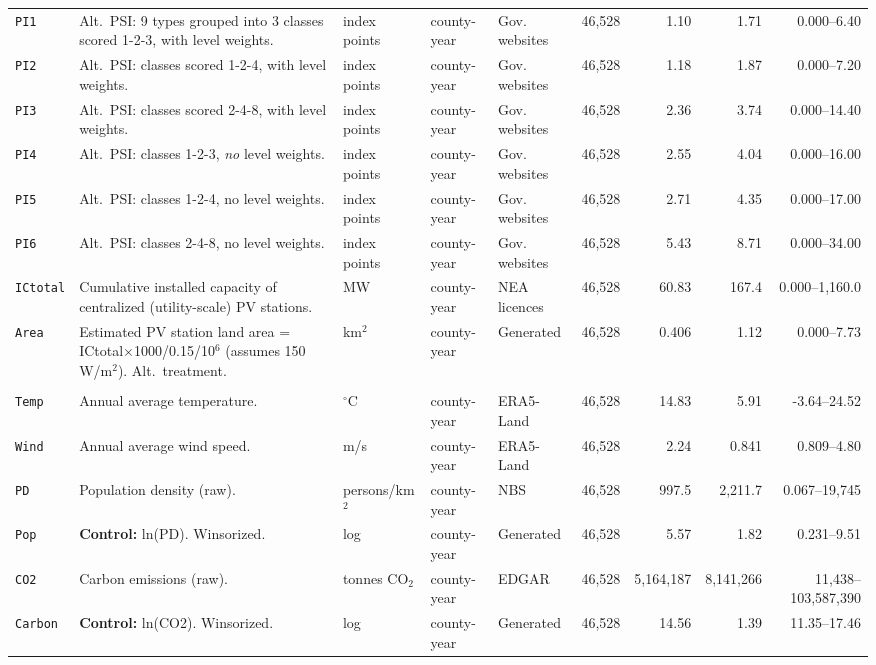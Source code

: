 \documentclass[10pt]{article}
\begin{document}
\begin{landscape}
{\begin{longtable}{>{\raggedright\arraybackslash}p{2.9cm}>{\raggedright\arraybackslash}p{8.0cm}>{\raggedright\arraybackslash}p{1.9cm}>{\raggedright\arraybackslash}p{1.7cm}>{\raggedright\arraybackslash}p{2.0cm}rrrr}
\texttt{PI1} & Alt.\ PSI: 9 types grouped into 3 classes scored 1-2-3, with level weights. & index points & county-year & Gov. websites & 46,528 & 1.10 & 1.71 & 0.000--6.40\\
\texttt{PI2} & Alt.\ PSI: classes scored 1-2-4, with level weights. & index points & county-year & Gov. websites & 46,528 & 1.18 & 1.87 & 0.000--7.20\\
\texttt{PI3} & Alt.\ PSI: classes scored 2-4-8, with level weights. & index points & county-year & Gov. websites & 46,528 & 2.36 & 3.74 & 0.000--14.40\\
\texttt{PI4} & Alt.\ PSI: classes 1-2-3, \emph{no} level weights. & index points & county-year & Gov. websites & 46,528 & 2.55 & 4.04 & 0.000--16.00\\
\texttt{PI5} & Alt.\ PSI: classes 1-2-4, no level weights. & index points & county-year & Gov. websites & 46,528 & 2.71 & 4.35 & 0.000--17.00\\
\texttt{PI6} & Alt.\ PSI: classes 2-4-8, no level weights. & index points & county-year & Gov. websites & 46,528 & 5.43 & 8.71 & 0.000--34.00\\
\texttt{ICtotal} & Cumulative installed capacity of centralized (utility-scale) PV stations. & MW & county-year & NEA licences & 46,528 & 60.83 & 167.4 & 0.000--1,160.0\\
\texttt{Area} & Estimated PV station land area = ICtotal$\times$1000/0.15/10$^6$ (assumes 150 W/m$^2$). Alt.\ treatment. & km$^2$ & county-year & Generated & 46,528 & 0.406 & 1.12 & 0.000--7.73\\
\midrule
\multicolumn{9}{l}{\rule{0pt}{12pt}\textbf{\color{jhublue}D. Control variables}}\\\midrule
\texttt{Temp} & Annual average temperature. & $^\circ$C & county-year & ERA5-Land & 46,528 & 14.83 & 5.91 & -3.64--24.52\\
\texttt{Wind} & Annual average wind speed. & m/s & county-year & ERA5-Land & 46,528 & 2.24 & 0.841 & 0.809--4.80\\
\texttt{PD} & Population density (raw). & persons/km$^2$ & county-year & NBS & 46,528 & 997.5 & 2,211.7 & 0.067--19,745\\
\texttt{Pop} & \textbf{Control:} ln(PD). Winsorized. & log & county-year & Generated & 46,528 & 5.57 & 1.82 & 0.231--9.51\\
\texttt{CO2} & Carbon emissions (raw). & tonnes CO$_2$ & county-year & EDGAR & 46,528 & 5,164,187 & 8,141,266 & 11,438--103,587,390\\
\texttt{Carbon} & \textbf{Control:} ln(CO2). Winsorized. & log & county-year & Generated & 46,528 & 14.56 & 1.39 & 11.35--17.46\\

\end{longtable}}
\end{landscape}
\end{document}
